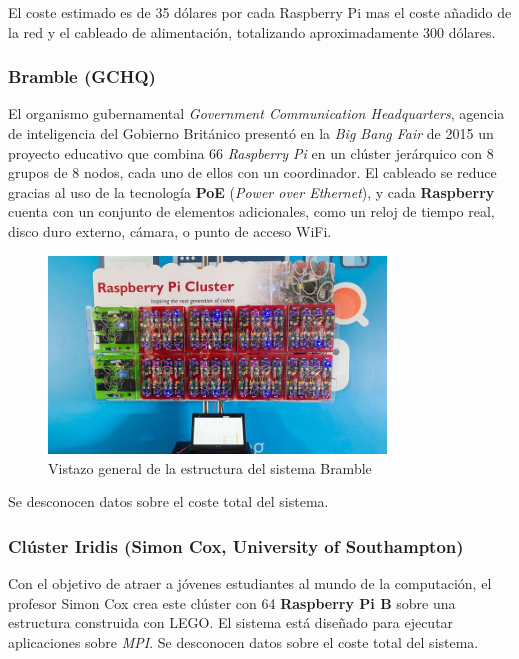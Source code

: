 El coste estimado es de 35 dólares por cada Raspberry Pi mas el coste añadido de la red y el cableado de alimentación, totalizando aproximadamente 300 dólares.

\subsubsection{Bramble (GCHQ)}

El organismo gubernamental \textit{Government Communication Headquarters}, agencia de inteligencia del Gobierno Británico presentó en la \textit{Big Bang Fair} de 2015 un proyecto educativo que combina 66 \textit{Raspberry Pi} en un clúster jerárquico con 8 grupos de 8 nodos, cada uno de ellos con un coordinador. El cableado se reduce gracias al uso de la tecnología \textbf{PoE} (\textit{Power over Ethernet}), y cada \textbf{Raspberry} cuenta con un conjunto de elementos adicionales, como un reloj de tiempo real, disco duro externo, cámara, o punto de acceso WiFi\cite{gchqbramble}.

\begin{figure}[H]
	\centering
	\includegraphics[width=0.8\textwidth]{Chapters/Chapter1/Figures/bramblegchq}
	\caption[Bramble]{Vistazo general de la estructura del sistema Bramble}
	\label{gchq:bramble}
\end{figure}

Se desconocen datos sobre el coste total del sistema.

\subsubsection{Clúster Iridis (Simon Cox, University of Southampton)}

Con el objetivo de atraer a jóvenes estudiantes al mundo de la computación, el profesor Simon Cox crea este clúster con 64 \textbf{Raspberry Pi B} sobre una estructura construida con LEGO\cite{cox:raspberry}. El sistema está diseñado para ejecutar aplicaciones sobre \textit{MPI}. Se desconocen datos sobre el coste total del sistema.

